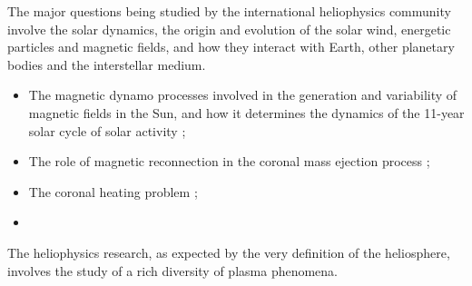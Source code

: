 \documentclass[12pt,a4paper,ruledheader]{report}
\begin{document}
\begin{appendix}
The major questions being studied by the international heliophysics community
involve the solar dynamics, the origin and evolution of the solar wind,
energetic particles and magnetic fields, and how they interact with Earth,
other planetary bodies and the interstellar medium. %
\begin{itemize}
\item The magnetic dynamo processes involved in the generation and variability
  of magnetic fields in the Sun, and how it determines the dynamics of the
  11-year solar cycle of solar activity \cite{Charbonneau2005};
\item The role of magnetic reconnection in the coronal mass ejection process
  \cite{Qiu2005};
\item The coronal heating problem \cite{Vinas2000,PP14,Pezzi2017};
\item   
\end{itemize}

The heliophysics research, as expected by the very definition of the heliosphere,
involves the study of a rich diversity of plasma phenomena. 








\end{appendix}
\end{document}
